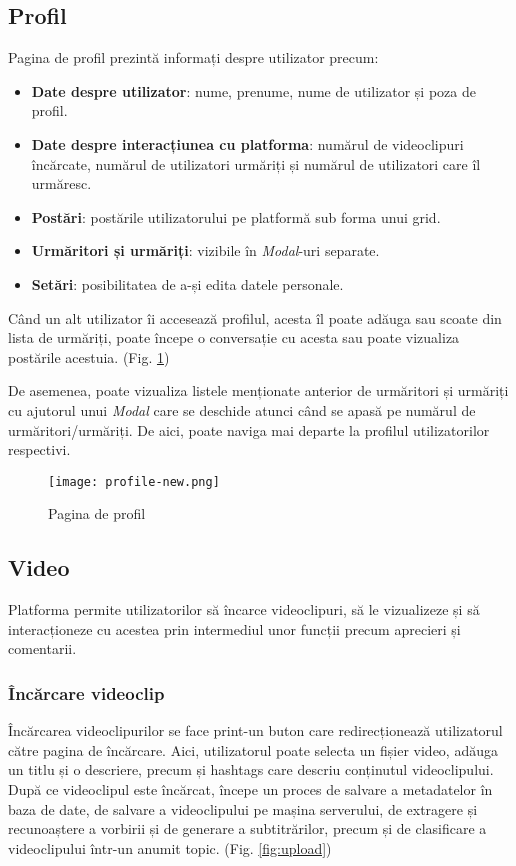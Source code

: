 \subsection{Profil}
Pagina de profil prezintă informați despre utilizator precum:
\begin{itemize}
    \item \textbf{Date despre utilizator}: nume, prenume, nume de utilizator și poza de profil. 
    \item \textbf{Date despre interacțiunea cu platforma}: numărul de videoclipuri încărcate,
    numărul de utilizatori urmăriți și numărul de utilizatori care îl urmăresc.
    \item \textbf{Postări}: postările utilizatorului pe platformă sub forma unui grid.
    \item \textbf{Urmăritori și urmăriți}: vizibile în \textit{Modal}-uri separate.
    \item \textbf{Setări}: posibilitatea de a-și edita datele personale.
\end{itemize}

\par
Când un alt utilizator îi accesează profilul, acesta îl poate adăuga sau scoate din lista de urmăriți,
poate începe o conversație cu acesta sau poate vizualiza postările acestuia. (Fig. \ref{fig:profile})
\par
De asemenea, poate vizualiza listele menționate anterior de urmăritori și urmăriți cu ajutorul unui
\textit{Modal} care se deschide atunci când se apasă pe numărul de urmăritori/urmăriți. De aici, poate
naviga mai departe la profilul utilizatorilor respectivi.

\begin{figure}[h!]
    \centering
    \texttt{[image: profile-new.png]}
    \caption{Pagina de profil}
    \label{fig:profile}
\end{figure}

\subsection{Video}
Platforma permite utilizatorilor să încarce videoclipuri, să le vizualizeze și să
interacționeze cu acestea prin intermediul unor funcții precum aprecieri și comentarii.
\subsubsection{Încărcare videoclip}
Încărcarea videoclipurilor se face print-un buton care redirecționează utilizatorul către
pagina de încărcare. Aici, utilizatorul poate selecta un fișier video, adăuga un titlu și
o descriere, precum și hashtags care descriu conținutul videoclipului. După ce
videoclipul este încărcat, începe un proces de salvare a metadatelor în baza de date,
de salvare a videoclipului pe mașina serverului, de extragere și recunoaștere a vorbirii
și de generare a subtitrărilor, precum și de clasificare a videoclipului într-un anumit
topic. (Fig. \ref{fig:upload})


